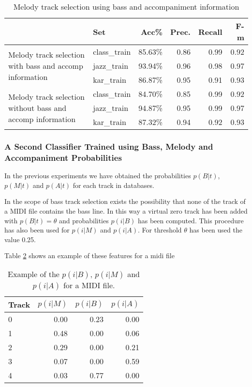 \documentclass{article}
\begin{document}
\begin{table}
\small
\begin{center}
\begin{tabular}{  l | l | r | r | r | r }
\hline
 & Set & Acc\% & Prec. & Recall & F-m \\
\hline
\multirow{3}{3.5cm}{Melody track selection with bass and accomp information} & class\_train & 85.63\% & 0.86 & 0.99 & 0.92 \\
& jazz\_train & 93.94\% & 0.96 & 0.98 & 0.97 \\
& kar\_train & 86.87\% & 0.95 & 0.91 & 0.93 \\
\hline
\multirow{3}{3.5cm}{Melody track selection without bass and accomp information} & class\_train & 84.70\% & 0.85 & 0.99 & 0.92 \\
 & jazz\_train & 94.87\% & 0.95 & 0.99 & 0.97 \\
 & kar\_train & 87.32\% & 0.94 & 0.92 & 0.93 \\
\hline
\end{tabular}
\caption{Melody track selection using bass and accompaniment information}
\label{table20}
\end{center}
\end{table}










\subsubsection{A Second Classifier Trained using  Bass, Melody and Accompaniment Probabilities}

In the previous experiments we have obtained the probabilities $p(B|t)$, $p(M|t)$ and $p(A|t)$ for each track in databases.

In the scope of bass track selection exists the possibility that none of the track of a MIDI file contains the bass line. In this way a virtual zero track has been added with $p(B|t)=\theta$ and probabilities $p(i|B)$ has been computed. This procedure has also been used for $p(i|M)$ and $p(i|A)$. For threshold $\theta$ has been used the value 0.25.

Table \ref{table21} shows an example of these features for a midi file

\begin{table}
\begin{center}
\begin{tabular}{  l | r  r  r }
\hline
 Track & $p(i|M)$ & $p(i|B)$ & $p(i|A)$ \\
\hline
\hline
0 & 0.00 & 0.23 & 0.00 \\
1 & 0.48 & 0.00 & 0.06 \\
2 & 0.29 & 0.00 & 0.21 \\
3 & 0.07 & 0.00 & 0.59 \\
4 & 0.03 & 0.77 & 0.00 \\
\hline
\end{tabular}
\caption{Example of the $p(i|B)$, $p(i|M)$ and $p(i|A)$ for a MIDI file.}
\label{table21}
\end{center}
\end{table}
\end{document}
